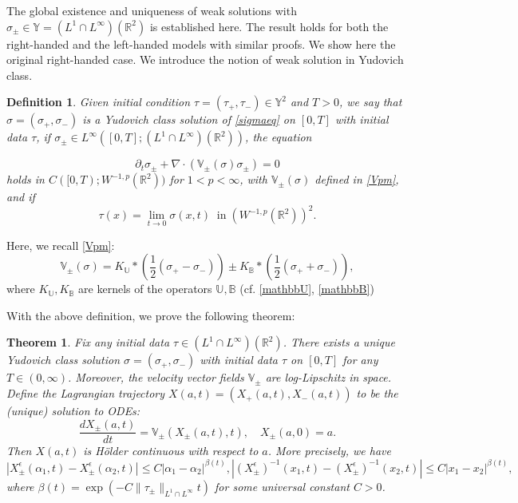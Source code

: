 \documentclass[11pt,reqno]{amsproc}
\newcommand{\pa}{\partial}
\newcommand{\la}{\label}
\newcommand{\na}{\nabla}
\newcommand{\be}{\begin{equation}}
\newcommand{\ee}{\end{equation}}
\newcommand{\Rr}{{\mathbb R}}
\newtheorem{thm}{Theorem}
\newtheorem{defi}{Definition}
\newcommand{\R}{\mathbb{R}}
\newcommand{\B}{\mathbb{B}}
\newcommand{\U}{\mathbb{U}}
\newcommand{\V}{\mathbb{V}}
\begin{document}
The global existence and uniqueness of weak solutions with $\sigma_\pm \in \mathbb Y = (L^1\cap L^{\infty})(\Rr^2)$ is established here. The result holds for both the right-handed and the left-handed models with similar proofs. We show here the original right-handed case. We introduce the notion of weak solution in Yudovich class. 
\begin{defi}\la{defn:weaknondeg}
    Given initial condition $\tau = (\tau_+, \tau_-) \in \mathbb Y^2$ and $T > 0$, we say that  $\sigma = (\sigma_+, \sigma_-)$  is a Yudovich class solution of \eqref{sigmaeq} on $[0,T]$ with initial data $\tau$, if 
   $\sigma_\pm \in L^\infty([0,T]; (L^1\cap L^\infty)(\R^2))$, the equation
   
   \begin{equation}\la{eq:continuity}
   \pa_t \sigma_{\pm} + \na\cdot(\V_{\pm}(\sigma)\sigma_{\pm} ) = 0
   \end{equation}
   holds in $C([0, T); W^{-1, p}(\Rr^2))$ for $1<p<\infty$, with $\V_{\pm}(\sigma)$ defined in \eqref{Vpm},
   and if 
   \[
   \tau (x) = \lim_{t \to 0}\sigma(x,t) \: \text{ in}\; (W^{-1,p}(\Rr^2))^2.
   \]
   \end{defi}
   Here, we recall \eqref{Vpm}:
     \[
     \V_{\pm}(\sigma)= K_\U * \left(\frac{1}{2}(\sigma_+ - \sigma_-)\right) \pm K_\B* \left(\frac{1}{2}(\sigma_+ + \sigma_-)\right),
     \] 
     where $K_\U, K_\B$ are kernels of the operators $\U, \B$ (cf. \eqref{mathbbU}, \eqref{mathbbB})
      

With the above definition, we prove the following theorem:

\begin{thm}\label{thm:Yudovich}
    Fix any initial data $\tau \in (L^1 \cap L^\infty)(\R^2)$. There exists a unique Yudovich class  solution $\sigma = (\sigma_+, \sigma_-)$ with initial data $\tau$ on $[0,T]$ for any $T \in (0,\infty)$.
    Moreover, the velocity vector fields $\V_{\pm}$ are log-Lipschitz in space. Define the Lagrangian trajectory $X(a,t) = (X_+(a,t), X_-(a,t))$ to be the (unique) solution to ODEs:
    \begin{equation}
        \label{trajectory}
        \frac{dX_\pm (a,t)}{dt} = \V_\pm (X_\pm(a,t),t),\quad X_\pm(a,0) = a.
    \end{equation}
    Then $X(a,t)$ is H\"older continuous with respect to $a$. More precisely, we have
        \begin{subequations} \la{est:holderX}
        \be
        |X_\pm^\epsilon(\alpha_1,t) -X_\pm^\epsilon(\alpha_2,t)| \le C|\alpha_1 - \alpha_2|^{\beta(t)},
        \ee
        \be
        |(X_\pm^\epsilon)^{-1}(x_1,t) -(X_\pm^\epsilon)^{-1}(x_2,t)| \le C|x_1 - x_2|^{\beta(t)},
        \ee
        \end{subequations}
    where $\beta(t) = \exp(-C\|\tau_\pm\|_{L^1 \cap L^\infty}t)$ for some universal constant $C > 0$.
\end{thm}
\end{document}
